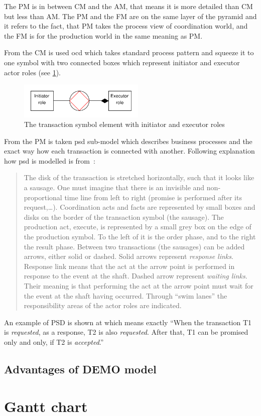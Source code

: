 The PM is in between CM and the AM, that means it is more detailed than CM but less than AM. The PM and the FM are on the same layer of the pyramid and it refers to the fact, that PM takes the process view of coordination world, and the FM is for the production world in the same meaning as PM.

From the CM is used \gls{ocd} which takes standard process pattern and squeeze it to one symbol with two connected boxes which represent initiator and executor actor roles (see \cref{fig:ocd-symbol-example}).

\begin{figure}[ht!]
	\centering
    \includegraphics[width=6cm, keepaspectratio]{img/ocd-symbol-example}
    \caption{The transaction symbol element with initiator and executor roles}
    \label{fig:ocd-symbol-example}
\end{figure}

From the PM is taken \gls{psd} sub-model which describes business processes and the exact way how each transaction is connected with another. Following explanation how \gls{psd} is modelled is from~\cite{perinforma-essence-2015}:

\begin{quote}
      The disk of the transaction is stretched horizontally, such that it looks like a sausage. One must imagine that there is an invisible and non-proportional time line from left to right (promise is performed after its request,\dots). Coordination acts and facts are represented by small boxes and disks on the border of the transaction symbol (the sausage). 
      The production act, execute, is represented by a small grey box on the edge of the production symbol. To the left of it is the order phase, and to the right the result phase.
      Between two transactions (the sausages) can be added arrows, either solid or dashed. Solid arrows represent \textit{response links}. Response link means that the act at the arrow point is performed in response to the event at the shaft. Dashed arrow represent \textit{waiting links}. Their meaning is that performing the act at the arrow point must wait for the event at the shaft having occurred. Through ``swim lanes'' the responsibility areas of the actor roles are indicated.
\end{quote}
An example of PSD is shown at  which means exactly ``When the transaction T1 is \textit{requested}, as a response, T2 is also \textit{requested}. After that, T1 can be promised only and only, if T2 is \textit{accepted}.''

\subsection{Advantages of DEMO model}

\section{Gantt chart}

